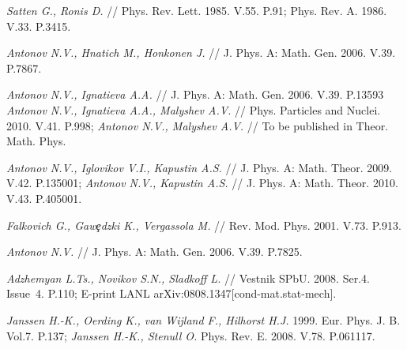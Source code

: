 \documentclass[12pt]{iopart}
\begin{document}
\begin{thebibliography}{99}
 {\it Satten G., Ronis D.} // Phys. Rev. Lett. 1985.
V.55. P.91; Phys. Rev. A. 1986. V.33. P.3415.

 {\it Antonov N.V., Hnatich M., Honkonen J.} //
J. Phys. A: Math. Gen. 2006. V.39. P.7867.

 {\it Antonov N.V., Ignatieva A.A.} //
J. Phys. A: Math. Gen. 2006. V.39. P.13593
{\it Antonov N.V., Ignatieva A.A., Malyshev A.V.} // Phys. Particles
and Nuclei. 2010. V.41. P.998; {\it Antonov N.V., Malyshev A.V.}
// To be published in Theor. Math. Phys.

 {\it Antonov N.V., Iglovikov V.I., Kapustin A.S.} //
J. Phys. A: Math. Theor. 2009. V.42. P.135001;
{\it Antonov N.V., Kapustin A.S.} // J. Phys. A: Math. Theor.
2010. V.43. P.405001.

 {\it Falkovich G., Gaw\c{e}dzki K., Vergassola M.} //
Rev. Mod. Phys. 2001. V.73. P.913.

 {\it Antonov N.V.} // J. Phys. A: Math. Gen. 2006.
V.39. P.7825.

 {\it Adzhemyan L.Ts., Novikov S.N., Sladkoff L.} //
Vestnik SPbU. 2008. Ser.4. Issue~4. P.110;
E-print LANL arXiv:0808.1347[cond-mat.stat-mech].

 {\it Janssen H.-K., Oerding K., van Wijland F.,
Hilhorst H.J.} 1999. Eur. Phys. J. B. Vol.7. P.137;
{\it Janssen H.-K., Stenull O.} Phys. Rev. E. 2008. V.78. P.061117.

\end{thebibliography}
\end{document}
